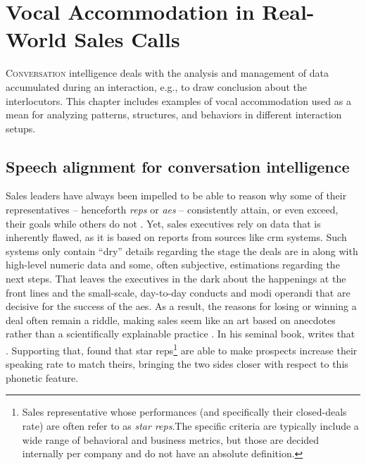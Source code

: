 \chapter{Vocal Accommodation in Real-World Sales Calls}
\label{chap:conv_analysis}

\lettrine{C}{onversation} intelligence deals with the analysis and management of data accumulated during an interaction, e.g., to draw conclusion about the interlocutors.
This chapter includes examples of vocal accommodation used as a mean for analyzing patterns, structures, and behaviors in different interaction setups.

\pagebreak

\section{Speech alignment for conversation intelligence}
\label{sec:conversation_intelligence}


Sales leaders have always been impelled to be able to reason why some of their representatives -- henceforth \emph{reps} or \emph{\acp{ae}} -- consistently attain, or even exceed, their goals while others do not \citep[see explanations and general overview in][]{Kovac2017its}.
Yet, sales executives rely on data that is inherently flawed, as it is based on reports from sources like \ac{crm} systems.
Such systems only contain \enquote{dry} details regarding the stage the deals are in along with high-level numeric data and some, often subjective, estimations regarding the next steps.
That leaves the executives in the dark about the happenings at the front lines and the small-scale, day-to-day conducts and modi operandi that are decisive for the success of the \acp{ae}.
As a result, the reasons for losing or winning a deal often remain a riddle, making sales seem like an art based on anecdotes rather than a scientifically explainable practice \citep{Yohn2016best, Martin2017six}.
In his seminal book, \citet{Gladwell2006tipping} writes that .
Supporting that, \citet{Orlob2018nine} found that star reps\footnote{Sales representative whose performances (and specifically their closed-deals rate) are often refer to as \emph{star reps}.The specific criteria are typically include a wide range of behavioral and business metrics, but those are decided internally per company and do not have an absolute definition.} are able to make prospects increase their speaking rate to match theirs, bringing the two sides closer with respect to this phonetic feature.

